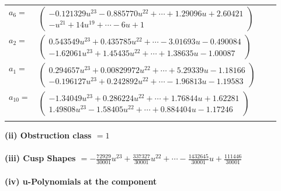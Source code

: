 \documentclass[1p]{elsarticle_modified}
\theoremstyle{definition}
\begin{document}
\begin{tabular}{m{7pt} m{180pt} m{7pt} m{180pt} }
\flushright $a_{6}=$&$\begin{pmatrix}-0.121329 u^{23}-0.885770 u^{22}+\cdots+1.29096 u+2.60421\\- u^{21}+14 u^{19}+\cdots-6 u+1\end{pmatrix}$ \\
\flushright $a_{2}=$&$\begin{pmatrix}0.543549 u^{23}+0.435785 u^{22}+\cdots-3.01693 u-0.490084\\-1.62061 u^{23}+1.45435 u^{22}+\cdots+1.38635 u-1.00087\end{pmatrix}$ \\
\flushright $a_{1}=$&$\begin{pmatrix}0.294657 u^{23}+0.00829972 u^{22}+\cdots+5.29339 u-1.18166\\-0.196127 u^{23}+0.242892 u^{22}+\cdots-1.96813 u-1.19583\end{pmatrix}$ \\
\flushright $a_{10}=$&$\begin{pmatrix}-1.34049 u^{23}+0.286224 u^{22}+\cdots+1.76844 u+1.62281\\1.49808 u^{23}-1.58405 u^{22}+\cdots+0.884404 u-1.17246\end{pmatrix}$\\&\end{tabular}
\flushleft \textbf{(ii) Obstruction class $= 1$}\\~\\
\flushleft \textbf{(iii) Cusp Shapes $= -\frac{72929}{30001} u^{23}+\frac{337327}{30001} u^{22}+\cdots-\frac{1432645}{30001} u+\frac{111446}{30001}$}\\~\\
\newpage\renewcommand{\arraystretch}{1}
\flushleft \textbf{(iv) u-Polynomials at the component}\newline \\
\end{document}
